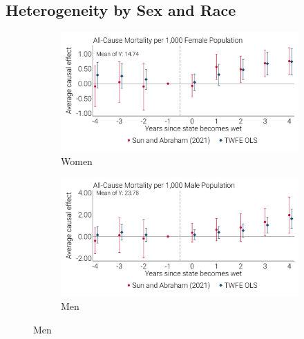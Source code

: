 \documentclass[12pt]{article}
\begin{document}
\FloatBarrier

\begin{landscape}

\section[Heterogeneity by Sex and Race]{Heterogeneity by Sex and Race\label{sec:app-het}}
\setcounter{table}{0}
\setcounter{figure}{0}

\begin{figure}[!ht]
    \caption[Event studies for Heterogeneity by Sex and Race]{Event studies for Heterogeneity by Sex and Race}
    \centering
    \begin{subfigure}{0.49\linewidth}
        \centering 
        \caption[Women]{Women}        
        \includegraphics[width=1.0\linewidth]{../analysis/output/appendix/figure_e1a_event_study_women_only.png}
    \end{subfigure}
    \begin{subfigure}{0.49\linewidth}
        \centering 
        \caption[Men]{Men}        
        \includegraphics[width=1.0\linewidth]{../analysis/output/appendix/figure_e1b_event_study_men_only.png}

\end{subfigure}
\end{figure}
\end{landscape}
\end{document}
